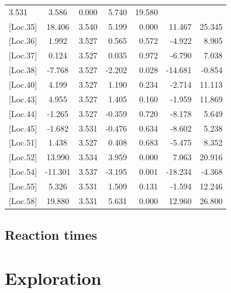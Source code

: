 \begin{longtable}{@{\extracolsep{\fill}}p{2.8cm}clrrrr@{}}
	\rowstyle{\bfseries} 3.531 & 
	\rowstyle{\bfseries} 3.586  & 
	\rowstyle{\bfseries} 0.000 & 
	\rowstyle{\bfseries} 5.740   & 
	\rowstyle{\bfseries} 19.580  \\
	\rowstyle{\bfseries} {[}Loc.35{]} & 
	\rowstyle{\bfseries} 18.406  & 
	\rowstyle{\bfseries} 3.540 & 
	\rowstyle{\bfseries} 5.199  & 
	\rowstyle{\bfseries} 0.000 & 
	\rowstyle{\bfseries} 11.467  & 
	\rowstyle{\bfseries} 25.345  \\
	{[}Loc.36{]} & 1.992   & 3.527 & 0.565  & 0.572 & -4.922  & 8.905   \\
	{[}Loc.37{]} & 0.124   & 3.527 & 0.035  & 0.972 & -6.790  & 7.038   \\
	\rowstyle{\bfseries} {[}Loc.38{]} & 
	\rowstyle{\bfseries} -7.768  & 
	\rowstyle{\bfseries} 3.527 & 
	\rowstyle{\bfseries} -2.202 & 
	\rowstyle{\bfseries} 0.028 & 
	\rowstyle{\bfseries} -14.681 & 
	\rowstyle{\bfseries} -0.854  \\
	{[}Loc.40{]} & 4.199   & 3.527 & 1.190  & 0.234 & -2.714  & 11.113  \\
	{[}Loc.43{]} & 4.955   & 3.527 & 1.405  & 0.160 & -1.959  & 11.869  \\
	{[}Loc.44{]} & -1.265  & 3.527 & -0.359 & 0.720 & -8.178  & 5.649   \\
	{[}Loc.45{]} & -1.682  & 3.531 & -0.476 & 0.634 & -8.602  & 5.238   \\
	{[}Loc.51{]} & 1.438   & 3.527 & 0.408  & 0.683 & -5.475  & 8.352   \\
	\rowstyle{\bfseries} {[}Loc.52{]} & 
	\rowstyle{\bfseries} 13.990  & 
	\rowstyle{\bfseries} 3.534 & 
	\rowstyle{\bfseries} 3.959  & 
	\rowstyle{\bfseries} 0.000 & 
	\rowstyle{\bfseries} 7.063   & 
	\rowstyle{\bfseries} 20.916  \\
	\rowstyle{\bfseries} {[}Loc.54{]} & 
	\rowstyle{\bfseries} -11.301 & 
	\rowstyle{\bfseries} 3.537 & 
	\rowstyle{\bfseries} -3.195 & 
	\rowstyle{\bfseries} 0.001 & 
	\rowstyle{\bfseries} -18.234 & 
	\rowstyle{\bfseries} -4.368  \\
	{[}Loc.55{]} & 5.326   & 3.531 & 1.509  & 0.131 & -1.594  & 12.246  \\
	\rowstyle{\bfseries} {[}Loc.58{]} & 
	\rowstyle{\bfseries} 19.880  & 
	\rowstyle{\bfseries} 3.531 & 
	\rowstyle{\bfseries} 5.631  & 
	\rowstyle{\bfseries} 0.000 & 
	\rowstyle{\bfseries} 12.960  & 
	\rowstyle{\bfseries} 26.800 \\
	\hline
\end{longtable}
\endgroup




\subsection{Reaction times}

\section{Exploration}
